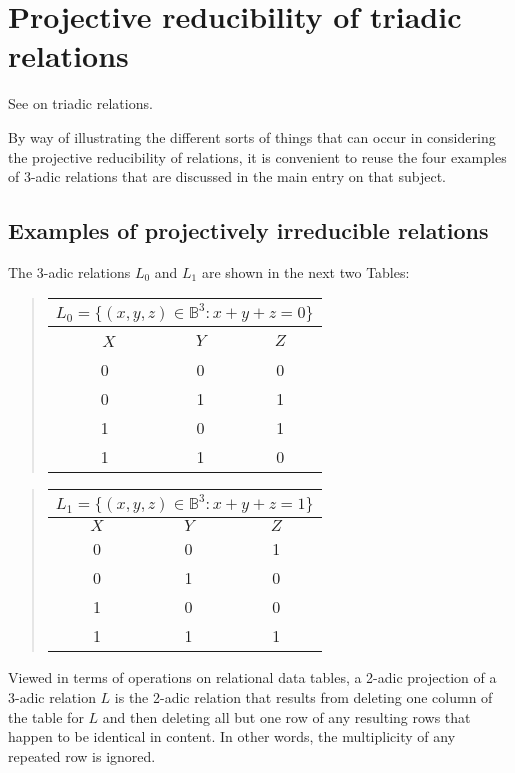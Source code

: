 \documentclass[12pt]{article}
\begin{document}
\section{Projective reducibility of triadic relations}

See  on triadic relations.

By way of illustrating the different sorts of things that can occur in considering the projective reducibility of relations, it is convenient to reuse the four examples of 3-adic relations that are discussed in the main entry on that subject.

\subsection{Examples of projectively irreducible relations}

The 3-adic relations $L_0$ and $L_1$ are shown in the next two Tables:

\begin{quote}\begin{tabular}{|c|c|c|}
\multicolumn{3}{c}{$L_0 = \{ (x, y, z) \in \mathbb{B}^3 : x + y + z = 0 \}$} \\
\hline\
$X$ & $Y$ & $Z$ \\
\hline\hline
 0  &  0  &  0  \\
\hline
 0  &  1  &  1  \\
\hline
 1  &  0  &  1  \\
\hline
 1  &  1  &  0  \\
\hline
\end{tabular}\end{quote}

\begin{quote}\begin{tabular}{|c|c|c|}
\multicolumn{3}{c}{$L_1 = \{ (x, y, z) \in \mathbb{B}^3 : x + y + z = 1 \}$} \\
\hline
$X$ & $Y$ & $Z$ \\
\hline\hline
 0  &  0  &  1  \\
\hline
 0  &  1  &  0  \\
\hline
 1  &  0  &  0  \\
\hline
 1  &  1  &  1  \\
\hline
\end{tabular}\end{quote}

Viewed in terms of operations on relational data tables, a 2-adic projection of a 3-adic relation $L$ is the 2-adic relation that results from deleting one column of the table for $L$ and then deleting all but one row of any resulting rows that happen to be identical in content.  In other words, the multiplicity of any repeated row is ignored.
\end{document}
